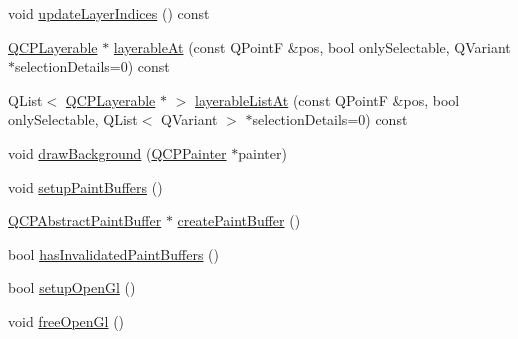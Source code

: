 \begin{DoxyCompactItemize}
\item 
void \mbox{\hyperlink{class_q_custom_plot_a7f1ca67a66d37b6d260a0b93de08f3bd}{update\+Layer\+Indices}} () const
\item 
\mbox{\hyperlink{class_q_c_p_layerable}{Q\+C\+P\+Layerable}} $\ast$ \mbox{\hyperlink{class_q_custom_plot_a12536fa6d5deb34ec620acb5134ca82a}{layerable\+At}} (const Q\+PointF \&pos, bool only\+Selectable, Q\+Variant $\ast$selection\+Details=0) const
\item 
Q\+List$<$ \mbox{\hyperlink{class_q_c_p_layerable}{Q\+C\+P\+Layerable}} $\ast$ $>$ \mbox{\hyperlink{class_q_custom_plot_ac9048589e78e7959d27a2c48c253e159}{layerable\+List\+At}} (const Q\+PointF \&pos, bool only\+Selectable, Q\+List$<$ Q\+Variant $>$ $\ast$selection\+Details=0) const
\item 
void \mbox{\hyperlink{class_q_custom_plot_a05dd52438cee4353b18c1e53a439008d}{draw\+Background}} (\mbox{\hyperlink{class_q_c_p_painter}{Q\+C\+P\+Painter}} $\ast$painter)
\item 
void \mbox{\hyperlink{class_q_custom_plot_a2685341f7242c3882f4cc5e379308d71}{setup\+Paint\+Buffers}} ()
\item 
\mbox{\hyperlink{class_q_c_p_abstract_paint_buffer}{Q\+C\+P\+Abstract\+Paint\+Buffer}} $\ast$ \mbox{\hyperlink{class_q_custom_plot_a943b57596a1adf7f0e75c3b50e407ae6}{create\+Paint\+Buffer}} ()
\item 
bool \mbox{\hyperlink{class_q_custom_plot_ad452b582348c8e99462d83fe1cd0279b}{has\+Invalidated\+Paint\+Buffers}} ()
\item 
bool \mbox{\hyperlink{class_q_custom_plot_a8954c4667c51070ff4e9b02d858fd190}{setup\+Open\+Gl}} ()
\item 
void \mbox{\hyperlink{class_q_custom_plot_aaa3073362074581a7b5905726b4a0067}{free\+Open\+Gl}} ()
\end{DoxyCompactItemize}
